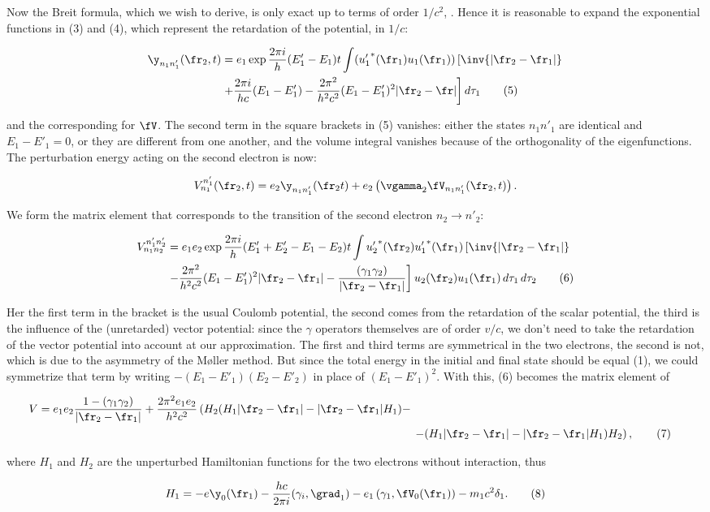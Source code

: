 \documentclass{article}
\newcommand{\nequ}[2]{
\begin{align*}
#1
\tag{#2}
\end{align*}
}
\newcommand{\uequ}[1]{
\begin{align*}
#1
\end{align*}
}
\begin{document}
Now the Breit formula, which we wish to derive, is only exact up to terms of order $1/c^2$, . Hence it is reasonable to expand the exponential functions in (3) and (4), which represent the retardation of the potential, in $1/c$:
\nequ{
\y_{n_1 n'_1}(\fr_2, t) &= e_1 \exp{\frac{2\pi i}{h}(E'_1 - E_1)t}
\int({u'_1}^*(\fr_1)u_1(\fr_1))\left[\inv{|\fr_2-\fr_1|}\right.\\
&\left. + \frac{2\pi i}{hc}(E_1 - E'_1) - \frac{2\pi^2}{h^2c^2}(E_1 - E'_1)^2|\fr_2-\fr|
\right]
{d\tau_1}
}{5}
and the corresponding for $\fV$. The second term in the square brackets in (5) vanishes: either the states $n_1 n'_1$ are identical and $E_1-E'_1 = 0$, or they are different from one another, and the volume integral vanishes because of the orthogonality of the eigenfunctions. The perturbation energy acting on the second electron is now:
\uequ{
V_{n_1}^{n'_1}(\fr_2, t) = e_2 \y_{n_1 n'_1}(\fr_2 t) + 
e_2 \left(\vgamma_2 \fV_{n_1 n'_1}(\fr_2, t) \right).
}
We form the matrix element that corresponds to the transition of the second electron $n_2 \to n'_2$:
\nequ{
V_{n_1 n_2}^{n'_1 n'_2} &= e_1 e_2 \exp{\frac{2\pi i}{h}(E'_1 + E'_2 - E_1 - E_2)t}
\int{u'_2}^*(\fr_2){u'_1}^*(\fr_1)\left[\inv{|\fr_2 - \fr_1|} \right.\\
&\left. - \frac{2\pi^2}{h^2c^2}(E_1 - E'_1)^2|\fr_2-\fr_1| 
- \frac{(\gamma_1 \gamma_2)}{|\fr_2-\fr_1|}\right]u_2(\fr_2)u_1(\fr_1)\,{d\tau_1}\,{d\tau_2}
}{6}
Her the first term in the bracket is the usual Coulomb potential, the second comes from the retardation of the scalar potential, the third is the influence of the (unretarded) vector potential: since the $\gamma$ operators themselves are of order $v/c$, we don't need to take the retardation of the vector potential into account at our approximation. The first and third terms are symmetrical in the two electrons, the second is not, which is due to the asymmetry of the Møller method. But since the total energy in the initial and final state should be equal (1), we could symmetrize that term by writing $-(E_1 - E'_1)(E_2 - E'_2)$ in place of $(E_1 - E'_1)^2$. With this, (6) becomes the matrix element of
\nequ{
V = e_1 e_2 \frac{1-(\gamma_1 \gamma_2)}{|\fr_2 - \fr_1|} + \frac{2\pi^2 e_1 e_2}{h^2 c^2}\left(
H_2(H_1|\fr_2-\fr_1| - |\fr_2-\fr_1|H_1) - \right.\\
&\left. - (H_1|\fr_2-\fr_1| - |\fr_2-\fr_1|H_1) H_2\right),
}{7}
where $H_1$ and $H_2$ are the unperturbed Hamiltonian functions for the two electrons without interaction, thus
\nequ{
H_1 = -e\y_0(\fr_1) - \frac{hc}{2\pi i}(\gamma_i, \grad_1) 
- e_1\left(\gamma_1, \fV_0(\fr_1) \right) - m_1 c^2 \delta_1.
}{8}
\end{document}
